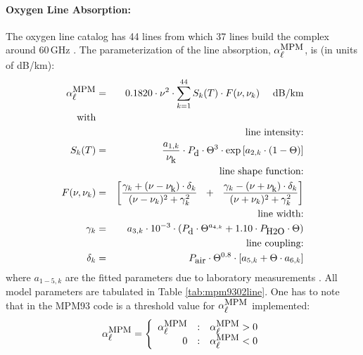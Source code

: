 \paragraph{Oxygen Line Absorption:}
\label{levele:mpm93_o2lines}
The oxygen line catalog has 44 lines from which 37 lines build the 
complex around 60\,GHz \citep{liebeetal:93}. The parameterization 
of the line absorption, $\alpha^{\mbox{\rm \small MPM}}_{\mbox{\small $\ell$}}$, is (in units of dB/km):
\begin{eqnarray}
  \alphampml & = & 0.1820 \cdot \nu^2 \cdot  
                   \sum_{k=1}^{44}{S_k(T) \cdot F(\nu,\nu_k)}~~~~\mbox{dB/km}\\
%
 \mbox{with} &   &\nonumber\\
%
 & & \mbox{line intensity:} \nonumber\\
      \label{eq:MPM93:O2_inten}
      S_k(T) & = & \frac{a_{1,k}}{\nuk} \cdot \pda \cdot \Theta^3 \cdot 
                   \exp{[a_{2,k} \cdot (1-\Theta)]}\\
 & & \mbox{line shape function:}  \nonumber\\
 F(\nu,\nu_k) & = & \left[\frac{\gamma_k+(\nu-\nuk)\cdot \delta_k}
                               {(\nu-\nu_k)^2+\gamma_k^2}~~+~~
                          \frac{\gamma_k-(\nu+\nuk)\cdot \delta_k}
                               {(\nu+\nu_k)^2+\gamma_k^2}\right] \nonumber\\
 & & \mbox{line width:}  \nonumber\\
     \label{eq:MPM93:O2_gamma}
     \gamma_k & = & a_{3,k} \cdot 10^{-3} \cdot 
                 \left( \pda  \cdot \Theta^{a_{4,k}} + 
                        1.10 \cdot \phzo \cdot \Theta \right)\\
& &  \mbox{line coupling:}  \nonumber\\
     \label{eq:MPM93:O2_coupling}
     \delta_k & = & \pdair \cdot \Theta^{0.8} \cdot 
                   \left[ a_{5,k} + \Theta \cdot a_{6,k} \right]\nonumber
\nonumber
\end{eqnarray}
%
where $a_{1-5,k}$ are the fitted parameters due to laboratory measurements 
\citep{liebeetal:92}. All model parameters are tabulated in 
Table \ref{tab:mpm9302line}. One has to note that in the MPM93 code is a 
threshold value for $\alpha^{\mbox{\rm \small MPM}}_{\mbox{\small $\ell$}}$ implemented:
\begin{equation}
 \label{eq:mpm93O2limit}
  \alphampml = 
   \left \{ \begin{array}{r@{\quad:\quad}l} 
    \alphampml & \alphampml > 0\\
    0          & \alphampml < 0
                       \end{array} \right.
\end{equation}
